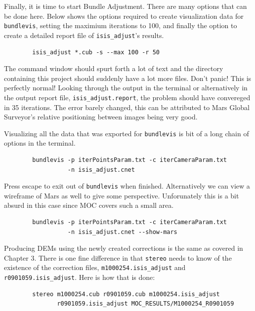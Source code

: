 Finally, it is time to start Bundle Adjustment. There are many options
that can be done here. Below shows the options required to create
visualization data for \texttt{bundlevis}, setting the maximium
iterations to 100, and finally the option to create a detailed report
file of \texttt{isis\_adjust}'s results.

\begin{verbatim}
        isis_adjust *.cub -s --max 100 -r 50
\end{verbatim}

The command window should spurt forth a lot of text and the directory
containing this project should suddenly have a lot more files. Don't
panic! This is perfectly normal! Looking through the output in the
terminal or alternatively in the output report file,
\verb=isis_adjust.report=, the problem should have convereged in 35
iterations. The error barely changed, this can be attributed to Mars
Global Surveyor's relative positioning between images being very good. 

Visualizing all the data that was exported for \texttt{bundlevis} is bit of a
long chain of options in the terminal.

\begin{verbatim}
        bundlevis -p iterPointsParam.txt -c iterCameraParam.txt 
                  -n isis_adjust.cnet
\end{verbatim}

Press escape to exit out of \texttt{bundlevis} when
finished. Alternatively we can view a wireframe of Mars as well to
give some perspective. Unforunately this is a bit absurd in this case
since MOC covers such a small area.

\begin{verbatim}
        bundlevis -p iterPointsParam.txt -c iterCameraParam.txt
                  -n isis_adjust.cnet --show-mars
\end{verbatim}

Producing DEMs using the newly created corrections is the same as
covered in Chapter 3. There is one fine difference in that
\texttt{stereo} needs to know of the existence of the correction
files, \verb=m1000254.isis_adjust= and
\verb=r0901059.isis_adjust=. Here is how that is done:

\begin{verbatim}
        stereo m1000254.cub r0901059.cub m1000254.isis_adjust
               r0901059.isis_adjust MOC_RESULTS/M1000254_R0901059
\end{verbatim}


